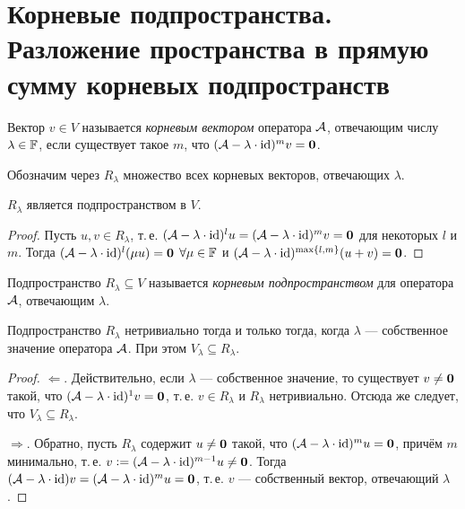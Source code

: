 \section{Корневые подпространства. Разложение пространства в прямую сумму корневых подпространств}

\begin{definition}
    Вектор $v \in V$ называется \textit{корневым вектором} оператора $\mathcal{A}$, отвечающим числу $\lambda \in \mathbb{F}$, если существует такое $m$, что $(\mathcal{A} - \lambda \cdot \mathrm{id})^mv = \boldsymbol{0}$.
\end{definition}

Обозначим через $R_\lambda$ множество всех корневых векторов, отвечающих $\lambda$.

\begin{proposal}
    $R_\lambda$ является подпространством в $V$.
\end{proposal}

\begin{proof}
    Пусть $u, v \in R_\lambda$, т.\,е. $(\mathcal{A} - \lambda \cdot \mathrm{id})^l u = (\mathcal{A} - \lambda \cdot \mathrm{id})^mv = \boldsymbol{0}$ для некоторых $l$ и $m$. Тогда $(\mathcal{A} - \lambda \cdot \mathrm{id})^l(\mu u) = \boldsymbol{0}$ $\forall \mu \in \mathbb{F}$ и $(\mathcal{A} - \lambda \cdot \mathrm{id})^{\max\{l, m\}}(u + v) = \boldsymbol{0}$.
\end{proof}

\begin{definition}
    Подпространство $R_\lambda \subseteq V$ называется \textit{корневым подпространством} для оператора $\mathcal{A}$, отвечающим $\lambda$.
\end{definition}

\begin{proposal}
    Подпространство $R_\lambda$ нетривиально тогда и только тогда, когда $\lambda$ --- собственное значение оператора $\mathcal{A}$. При этом $V_\lambda \subseteq R_\lambda$.
\end{proposal}

\begin{proof}
    $\Leftarrow$. Действительно, если $\lambda$ --- собственное значение, то существует $v \ne \boldsymbol{0}$ такой, что $(\mathcal{A} - \lambda \cdot \mathrm{id})^1v = \boldsymbol{0}$, т.\,е. $v \in R_\lambda$ и $R_\lambda$ нетривиально. Отсюда же следует, что $V_\lambda \subseteq R_\lambda$.

    $\Rightarrow$. Обратно, пусть $R_\lambda$ содержит $u \ne \boldsymbol{0}$ такой, что $(\mathcal{A} - \lambda \cdot \mathrm{id})^mu = \boldsymbol{0}$, причём $m$ минимально, т.\,е. $v \vcentcolon = (\mathcal{A} - \lambda \cdot \mathrm{id})^{m - 1}u \ne \boldsymbol{0}$. Тогда $(\mathcal{A} - \lambda \cdot \mathrm{id})v = (\mathcal{A} - \lambda \cdot \mathrm{id})^mu = \boldsymbol{0}$, т.\,е. $v$ --- собственный вектор, отвечающий $\lambda$.
\end{proof}

